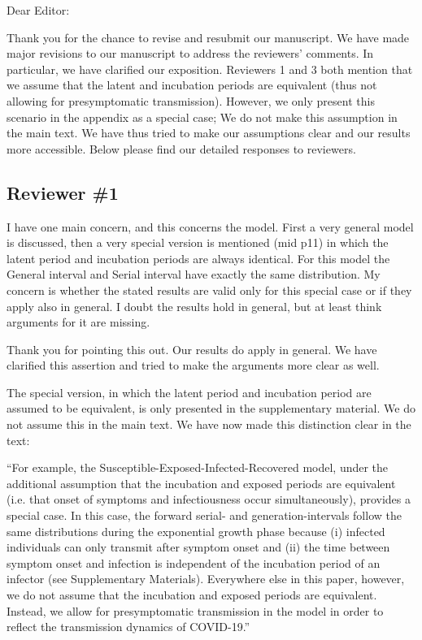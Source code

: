 \documentclass[12pt]{article}
\newcommand{\rev}{\subsection*}
\newcommand{\revtext}{\textsf}
\begin{document}
\noindent Dear Editor:

Thank you for the chance to revise and resubmit our manuscript. 
We have made major revisions to our manuscript to address the reviewers' comments.
In particular, we have clarified our exposition.
Reviewers 1 and 3 both mention that we assume that the latent and incubation periods are equivalent (thus not allowing for presymptomatic transmission). 
However, we only present this scenario in the appendix as a special case; We do not make this assumption in the main text.
We have thus tried to make our assumptions clear and our results more accessible.
Below please find our detailed responses to reviewers.

\rev{Reviewer \#1}

\revtext{I have one main concern, and this concerns the model. First a very general model is discussed, then a very special version is mentioned (mid p11) in which the latent period and incubation periods are always identical. For this model the General interval and Serial interval have exactly the same distribution. My concern is whether the stated results are valid only for this special case or if they apply also in general. I doubt the results hold in general, but at least think arguments for it are missing.}

Thank you for pointing this out. Our results do apply in general. We have clarified this assertion and tried to make the arguments more clear as well.

The special version, in which the latent period and incubation period are assumed to be equivalent, is only presented in the supplementary material. We do not assume this in the main text. We have now made this distinction clear in the text:

``For example, the Susceptible-Exposed-Infected-Recovered model, under the additional assumption that the incubation and exposed periods are equivalent (i.e. that onset of symptoms and infectiousness occur simultaneously), provides a special case.
In this case, the forward serial- and generation-intervals follow the same distributions during the exponential growth phase because (i) infected individuals can only transmit after symptom onset and (ii) the time between symptom onset and infection is independent of the incubation period of an infector (see Supplementary Materials).
Everywhere else in this paper, however, we do not assume that the incubation and exposed periods are equivalent.
Instead, we allow for presymptomatic transmission in the model in order to reflect the transmission dynamics of COVID-19.''
\end{document}
